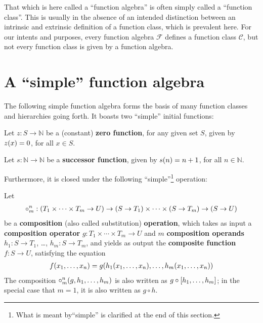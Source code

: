 \begin{remark} That which is here called a ``function algebra'' is often simply
called a ``function class''. This is usually in the absence of an intended
distinction between an intrinsic and extrinsic definition of a function class,
which is prevalent here. For our intents and purposes, every function algebra
$\mathcal{F}$ defines a function class $\mathcal{C}$, but not every function
class is given by a function algebra.  \end{remark} 

\section{A ``simple'' function algebra}

The following simple function algebra forms the basis of many function classes
and hierarchies going forth. It boasts two ``simple'' initial functions:

\begin{definition} \label{def:zero-function} Let $z : S \rightarrow \mathbb{N}$
be a (constant) \textbf{zero function}, for any given set $S$, given by $z{\mathopen{}\left({x}\right)\mathclose{}}
= 0$, for all $x \in S$.   \end{definition}

\begin{definition} \label{def:successor-function} Let $s : \mathbb{N}
\rightarrow \mathbb{N}$ be a \textbf{successor function}, given by $s{\mathopen{}\left({n}\right)\mathclose{}} = n
+ 1$, for all $n \in \mathbb{N}$.  \end{definition}

Furthermore, it is closed under the following ``simple''\footnote{What is meant
by``simple'' is clarified at the end of this section.} operation:

\begin{definition} \label{def:composition-operation} Let\begin{align*}
%
\circ^n_m : \p{T_1 \times \cdots \times T_m \rightarrow U} \rightarrow \p{S
\rightarrow T_1} \times \cdots \times \p{S \rightarrow T_m} \rightarrow \p{S
\rightarrow U}
%
\end{align*}be a \textbf{composition} (also called substitution)
\textbf{operation}, which takes as input a \textbf{composition operator} $g :
T_1 \times \cdots \times T_m \rightarrow U$ and $m$ \textbf{composition
operands} $h_1 : S \rightarrow T_1$, \ldots, $h_m : S \rightarrow T_m$, and
yields as output the \textbf{composite function} $f : S \rightarrow U$,
satisfying the equation\begin{align*}
%
f\p{x_1,\ldots,x_n} = g\p{h_1\p{x_1,\ldots,x_n}, \ldots, h_m\p{x_1,
\ldots,x_n}}
%
\end{align*} The composition $\circ^n_m{\mathopen{}\left({g,h_1, \ldots, h_m}\right)\mathclose{}}$ is also written
as $g \circ \mathopen{}\left[{h_1, \ldots, h_m}\right]\mathclose{}$; in the special case that $m=1$, it is also
written as $g \circ h$.\end{definition}

